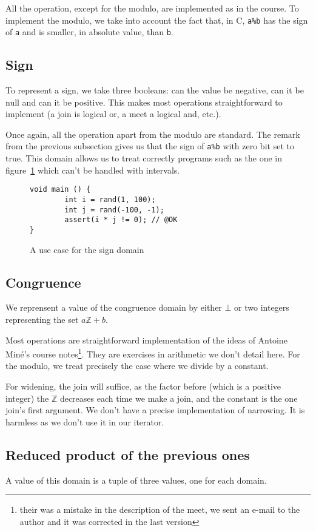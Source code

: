 \documentclass[11pt]{article}
\begin{document}
All the operation, except for the modulo, are implemented as in the course. To
implement the modulo, we take into account the fact that, in \textsf{C},
\texttt{a\%b} has the sign of \texttt{a} and is smaller, in absolute value, than
\texttt{b}.
\subsection{Sign}
To represent a sign, we take three booleans: can the value be negative, can it
be null and can it be positive. This makes most operations straightforward to
implement (a join is logical or, a meet a logical and, etc.).

Once again, all the operation apart from the modulo are standard. The remark
from the previous subsection gives us that the sign of \texttt{a\%b} with zero
bit set to true. This domain allows us to treat correctly programs such as the
one in figure~\ref{sign} which can't be handled with intervals.
\begin{figure}[h]
\begin{verbatim}
void main () {
        int i = rand(1, 100);
        int j = rand(-100, -1);
        assert(i * j != 0); // @OK
}
\end{verbatim}
\caption{A use case for the sign domain}\label{sign}
\end{figure}
\subsection{Congruence}
We reprensent a value of the congruence domain by either $\bot$ or two integers
representing the set $a\mathbb{Z}+b$.

Most operations are straightforward implementation of the ideas of Antoine
Miné's course notes\footnote{their was a mistake in the description of the meet,
we sent an e-mail to the author and it was corrected in the last version}. They
are exercises in arithmetic we don't detail here. For the modulo, we treat
precisely the case where we divide by a constant.

For widening, the join will suffice, as the factor before (which is a positive
integer) the $\mathbb{Z}$ decreases each time we make a join, and the constant
is the one join's first argument. We don't have a precise implementation of
narrowing. It is harmless as we don't use it in our iterator.
\subsection{Reduced product of the previous ones}
A value of this domain is a tuple of three values, one for each domain.
\end{document}
